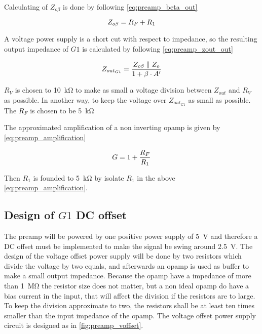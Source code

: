 Calculating of $Z_{o\beta}$ is done by following \autoref{eq:preamp_beta_out}

\begin{equation}\label{eq:preamp_beta_out}
        Z_{o\beta} = R_F+R_1
        \addunit{\si{\ohm}}
    \end{equation}

A voltage power supply is a short cut with respect to impedance, so the resulting output impedance of $G1$ is calculated by following \autoref{eq:preamp_zout_out} 

\begin{equation}\label{eq:preamp_zout_out}
        Z_{out_{G1}} = \frac{ Z_{o\beta} \parallel Z_{o} }{1+\beta \cdot A'}
        \addunit{\si{\ohm}}
    \end{equation}
    \startexplain
    \stopexplain

$R_V$ is chosen to \SI{10}{\kilo\ohm} to make as small a voltage division between $Z_{out}$ and $R_V$ as possible. In another way, to keep the voltage over $Z_{out_{G1}}$ as small as possible. The $R_F$ is chosen to be \SI{5}{\kilo\ohm} 


The approximated amplification of a non inverting \gls{opamp} is given by \autoref{eq:preamp_amplification}

\begin{equation}\label{eq:preamp_amplification}
        G =1+\frac{R_F}{R_1}
        \addunit{\si{1}}
    \end{equation}

    \startexplain
    \stopexplain

Then  $R_1$ is founded to \SI{5}{\kilo\ohm} by isolate $R_1$ in the above \autoref{eq:preamp_amplification}.
 
   
\subsection{Design of $G1$ DC offset}
The \gls{preamp} will be powered by one positive power supply of \SI{5}{\volt} and therefore a DC offset must be implemented to make the signal be swing around \SI{2.5}{\volt}. 
The design of the voltage offset power supply will be done by two resistors which divide the voltage by two equals, and afterwards an \gls{opamp} is used as buffer  to make a small output impedance. Because the \gls{opamp} have a impedance of more than \SI{1}{\mega\ohm} the resistor size does not matter, but a non ideal \gls{opamp} do have a bias current in the input, that will affect the division if the resistors are to large. To keep the division approximate to two, the resistors shall be at least ten times smaller than the input impedance of the \gls{opamp}. The voltage offset power supply circuit is designed as in \autoref{fig:preamp_voffset}.
    
